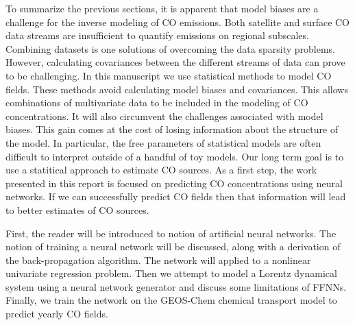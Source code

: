 To summarize the previous sections, it is apparent that model biases are a challenge for the inverse modeling of CO emissions. Both satellite and surface CO data streams are insufficient to quantify emissions on regional subscales. Combining datasets is one solutions of overcoming the data sparsity problems. However, calculating covariances between the different streams of data can prove to be challenging. In this manuscript we use statistical methods to model CO fields. These methods avoid calculating model biases and covariances. This allows combinations of multivariate data to be included in the modeling of CO concentrations. It will also circumvent the challenges associated with model biases. This gain comes at the cost of losing information about the structure of the model. In particular, the free parameters of statistical models are often difficult to interpret outside of a handful of toy models. Our long term goal is to use a statitical approach to estimate CO sources. As a first step, the work presented in this report is focused on predicting CO concentrations using neural networks. If we can successfully predict CO fields then that information will lead to better estimates of CO sources.

First, the reader will be introduced to notion of artificial neural networks. The notion of training a neural network will be discussed, along with a derivation of the back-propagation algorithm. The network will applied to a nonlinear univariate regression problem. Then we attempt to model a Lorentz dynamical system using a neural network generator and discuss some limitations of FFNNs. Finally, we train the network on the GEOS-Chem chemical transport model to predict yearly CO fields.